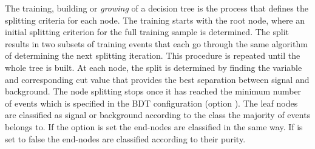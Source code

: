 The training, building or {\em growing} of a decision tree is the
process that defines the splitting criteria for each node. The
training starts with the root node, where an initial splitting
criterion for the full training sample is determined. The split
results in two subsets of training events that each go through the
same algorithm of determining the next splitting iteration. This
procedure is repeated until the whole tree is built. At each node, the
split is determined by finding the variable and corresponding cut
value that provides the best separation between signal and background.
The node splitting stops once it has reached the minimum number
of events which is specified in the BDT configuration (option
).  The leaf nodes are classified as signal or
background according to the class the majority of events belongs to.
If the option  is set the end-nodes are classified
in the same way. If  is set to false the end-nodes
are classified according to their purity.
 

